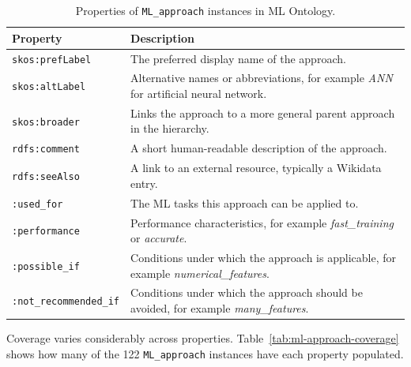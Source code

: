 \begin{table}[H]
\centering
\caption[ML\_approach properties]{Properties of \texttt{ML\_approach} 
instances in ML Ontology.}
\label{tab:ml-approach-properties}
\begin{tabularx}{\textwidth}{lX}
\toprule
\textbf{Property} & \textbf{Description} \\
\midrule
\texttt{skos:prefLabel} & The preferred display name of the approach. \\
\midrule
\texttt{skos:altLabel} & Alternative names or abbreviations, 
for example \textit{ANN} for artificial neural network. \\
\midrule
\texttt{skos:broader} & Links the approach to a more general 
parent approach in the hierarchy. \\
\midrule
\texttt{rdfs:comment} & A short human-readable description 
of the approach. \\
\midrule
\texttt{rdfs:seeAlso} & A link to an external resource, 
typically a Wikidata entry. \\
\midrule
\texttt{:used\_for} & The ML tasks this approach can be 
applied to. \\
\midrule
\texttt{:performance} & Performance characteristics, 
for example \textit{fast\_training} or \textit{accurate}. \\
\midrule
\texttt{:possible\_if} & Conditions under which the approach 
is applicable, for example \textit{numerical\_features}. \\
\midrule
\texttt{:not\_recommended\_if} & Conditions under which the 
approach should be avoided, for example \textit{many\_features}. \\
\bottomrule
\end{tabularx}
\end{table}

Coverage varies considerably across properties. 
Table~\ref{tab:ml-approach-coverage} shows how many of the 
122 \texttt{ML\_approach} instances have each property populated.


